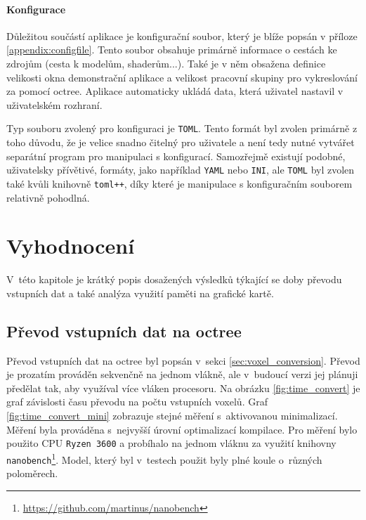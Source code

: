 \subsubsection{Konfigurace}
Důležitou součástí aplikace je konfigurační soubor, který je blíže popsán v příloze \ref{appendix:configfile}. Tento soubor obsahuje primárně informace o cestách ke zdrojům (cesta k modelům, shaderům...). Také je v něm obsažena definice velikosti okna demonstrační aplikace a velikost pracovní skupiny pro vykreslování za pomocí octree. Aplikace automaticky ukládá data, která uživatel nastavil v uživatelském rozhraní.

Typ souboru zvolený pro konfiguraci je \texttt{TOML}. Tento formát byl zvolen primárně z toho důvodu, že je velice snadno čitelný pro uživatele a není tedy nutné vytvářet separátní program pro manipulaci s konfigurací. Samozřejmě existují podobné, uživatelsky přívětivé, formáty, jako například \texttt{YAML} nebo \texttt{INI}, ale \texttt{TOML} byl zvolen také kvůli knihovně \texttt{toml++}, díky které je manipulace s konfiguračním souborem relativně pohodlná. 


\chapter{Vyhodnocení}
\label{testovani}
V~této kapitole je krátký popis dosažených výsledků týkající se doby převodu vstupních dat a také analýza využití paměti na grafické kartě.

\section{Převod vstupních dat na octree}
Převod vstupních dat na octree byl popsán v~sekci \ref{sec:voxel_conversion}. Převod je prozatím prováděn sekvenčně na jednom vlákně, ale v~budoucí verzi jej plánuji předělat tak, aby využíval více vláken procesoru. Na obrázku \ref{fig:time_convert} je graf závislosti času převodu na počtu vstupních voxelů. Graf \ref{fig:time_convert_mini} zobrazuje stejné měření s~aktivovanou minimalizací. Měření byla prováděna s~nejvyšší úrovní optimalizací kompilace. Pro měření bylo použito CPU \texttt{Ryzen 3600} a probíhalo na jednom vláknu za využití knihovny \texttt{nanobench}\footnote{\url{https://github.com/martinus/nanobench}}. Model, který byl v~testech použit byly plné koule o~různých poloměrech.


